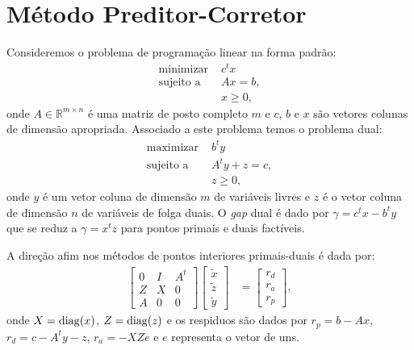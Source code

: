 % 
% 
% 

\section{Método Preditor-Corretor}
Consideremos o problema de programação linear na forma padrão:
\begin{align*}
    \text{minimizar } & c^t x \\
    \text{sujeito a } & A x = b, \\
    & x \geq 0,
\end{align*}
onde $A \in \mathbb{R}^{m \times n}$ é uma matriz de posto completo $m$ e $c$,
$b$ e $x$ são vetores colunas de dimensão apropriada. Associado a este problema
temos o problema dual:
\begin{align*}
    \text{maximizar } & b^t y \\
    \text{sujeito a } & A^t y + z = c, \\
    & z \geq 0,
\end{align*}
onde $y$ é um vetor coluna de dimensão $m$ de variáveis livres e $z$ é o vetor
coluna de dimensão $n$ de variáveis de folga duais. O \textit{gap} dual é dado
por $\gamma = c^t x - b^t y$ que se reduz a $\gamma = x^t z$ para pontos primais
e duais factíveis.

A direção afim nos métodos de pontos interiores primais-duais é dada por:
\begin{align}
    \begin{bmatrix}
         0 & I & A^t \\
         Z & X & 0 \\
         A & 0 & 0
     \end{bmatrix} \begin{bmatrix}
         \tilde{x} \\
         \tilde{z} \\
         \tilde{y}
     \end{bmatrix} &= \begin{bmatrix}
         r_d \\
         r_a \\
         r_p
     \end{bmatrix},
     \label{eq:primal_dual_intp:lin_system}
\end{align}
onde $X = \operatorname*{diag}(x)$, $Z = \operatorname*{diag}(z)$ e os respiduos são dados por $r_p = b - A
x$, $r_d = c - A^t y - z$, $r_a = - X Z e$ e $e$ representa o vetor de uns.

